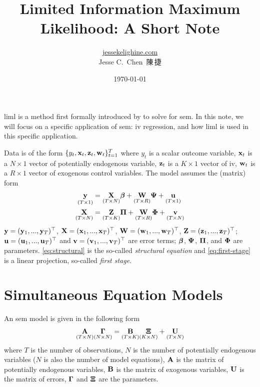 \documentclass[a4paper]{article}
\title{Limited Information Maximum Likelihood: A Short Note}
\author{\href{https://jessekelighine.com}{jessekelighine.com}\\Jesse C.\ Chen\ 陳\,捷}
\date{\today}
\begin{document}
\maketitle

\begin{remark}
	\gls*{liml} is a method first formally introduced by \textcite{anderson-rubin-1949} to solve for \gls*{sem}.
	In this note,
	we will focus on a specific application of \gls*{sem}: \gls*{iv} regression,
	and how \gls*{liml} is used in this specific application.
\end{remark}

\begin{definition}\label{dfn:iv}
	Data is of the form $\{y_t,\xx_t,\zz_t,\ww_t\}_{t=1}^{T}$ where
	$y_t$ is a scalar outcome variable,
	$\xx_t$ is a $N\times 1$ vector of potentially endogenous variable,
	$\zz_t$ is a $K\times 1$ vector of \gls*{iv},
	$\ww_t$ is a $R\times 1$ vector of exogenous control variables.
	The model assumes the (matrix) form
	\begin{align}
		\underset{(T\times 1)}{\yy}
		&= \underset{(T\times N)}{\XX}\bbeta + \underset{(T\times R)}{\WW}\PSI + \underset{(T\times 1)}{\uu}
		\label{eq:structural} \\
		\underset{(T\times N)}{\XX}
		&= \underset{(T\times K)}{\ZZ}\PI + \underset{(T\times R)}{\WW}\PHI + \underset{(T\times N)}{\vv}
		\label{eq:first-stage}
	\end{align}
	$\yy=(\yy_1,...,\yy_T)\T$,
	$\XX=(\xx_1,...,\xx_T)\T$,
	$\WW=(\ww_1,...,\ww_T)\T$,
	$\ZZ=(\zz_1,...,\zz_T)\T$;
	$\uu=(\uu_1,...,\uu_T)\T$ and $\vv=(\vv_1,...,\vv_T)\T$ are error terms;
	$\bbeta$, $\PSI$, $\PI$, and $\PHI$ are parameters.
	\autoref{eq:structural} is the so-called \emph{structural equation} and
	\autoref{eq:first-stage} is a linear projection, so-called \emph{first stage}.
\end{definition}

\section{Simultaneous Equation Models}

\begin{definition}\label{dfn:sem}
	An \gls*{sem} model is given in the following form
	\begin{align}\label{eq:sem}
		\underset{(T\times N)}{\AA}
		\underset{(N\times N)}{\GAMMA}
		=
		\underset{(T\times K)}{\BB}
		\underset{(K\times N)}{\XI}
		+
		\underset{(T\times N)}{\UU}
	\end{align}
	where
	$T$ is the number of observations,
	$N$ is the number of potentially endogenous variables
	($N$ is also the number of model equations),
	$\AA$ is the matrix of potentially endogenous variables,
	$\BB$ is the matrix of exogenous variables,
	$\UU$ is the matrix of errors,
	$\GAMMA$ and $\XI$ are the parameters.
\end{definition}
\end{document}
